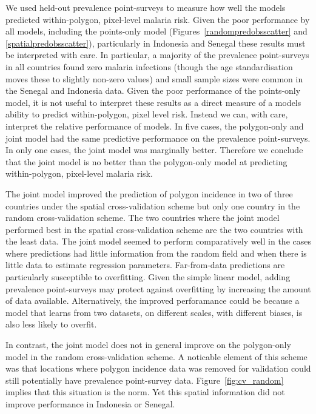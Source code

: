 \documentclass[10pt,letterpaper]{article}
\begin{document}
We used held-out prevalence point-surveys to measure how well the models predicted within-polygon, pixel-level malaria risk.
Given the poor performance by all models, including the points-only model (Figures~\ref{randompredobsscatter} and \ref{spatialpredobsscatter}), particularly in Indonesia and Senegal these results must be interpreted with care.
In particular, a majority of the prevalence point-surveys in all countries found zero malaria infections (though the age standardisation moves these to slightly non-zero values) and small sample sizes were common in the Senegal and Indonesia data.
Given the poor performance of the points-only model, it is not useful to interpret these results as a direct measure of a models ability to predict within-polygon, pixel level risk.
Instead we can, with care, interpret the relative performance of models.
In five cases, the polygon-only and joint model had the same predictive performance on the prevalence point-surveys.
In only one cases, the joint model was marginally better.
Therefore we conclude that the joint model is no better than the polygon-only model at predicting within-polygon, pixel-level malaria risk.






The joint model improved the prediction of polygon incidence in two of three countries under the spatial cross-validation scheme but only one country in the random cross-validation scheme.
The two countries where the joint model performed best in the spatial cross-validation scheme are the two countries with the least data.
The joint model seemed to perform comparatively well in the cases where predictions had little information from the random field and when there is little data to estimate regression parameters.
Far-from-data predictions are particularly susceptible to overfitting.
Given the simple linear model, adding prevalence point-surveys may protect against overfitting by increasing the amount of data available.
Alternatively, the improved perforamance could be because a model that learns from two datasets, on different scales, with different biases, is also less likely to overfit.


In contrast, the joint model does not in general improve on the polygon-only model in the random cross-validation scheme.
A noticable element of this scheme was that locations where polygon incidence data was removed for validation could still potentially have prevalence point-survey data.
Figure~\ref{fig:cv_random} implies that this situation is the norm.
Yet this spatial information did not improve performance in Indonesia or Senegal.
\end{document}

